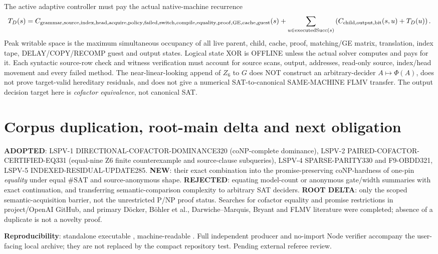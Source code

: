 \documentclass[11pt]{article}
\begin{document}
\noindent The active adaptive controller must pay the actual native-machine recurrence
\[
T_D(s)=C_{\rm grammar,source,index,head,acquire,policy,failed,switch,
compile,equality,proof,GE,cache,guest}(s)
+\sum_{u\in{\rm executedSucc}(s)}
\left(C_{\rm child,output,bit}(s,u)+T_D(u)\right).
\]
Peak writable space is the maximum simultaneous occupancy of all live parent, child, cache, proof, matching/GE matrix, translation, index tape, DELAY/COPY/RECOMP guest and output states. Logical state XOR is OFFLINE unless the actual solver computes and pays for it. Each syntactic source-row check and witness verification must account for source scans, output, addresses, read-only source, index/head movement and every failed method. The near-linear-looking append of $Z_6$ to $G$ does NOT construct an arbitrary-decider $A\mapsto\Phi(A)$, does not prove target-valid hereditary residuals, and does not give a numerical SAT-to-canonical SAME-MACHINE FLMV transfer. The output decision target here is \emph{cofactor equivalence}, not canonical SAT.

\section{Corpus duplication, root-main delta and next obligation}
\noindent\textbf{ADOPTED}: LSPV-1 DIRECTIONAL-COFACTOR-DOMINANCE320 (coNP-complete dominance), LSPV-2 PAIRED-COFACTOR-CERTIFIED-EQ331 (equal-nine Z6 finite counterexample and source-clause subqueries), LSPV-4 SPARSE-PARITY330 and F9-OBDD321, LSPV-5 INDEXED-RESIDUAL-UPDATE285. \textbf{NEW}: their exact combination into the promise-preserving coNP-hardness of one-pin \emph{equality} under equal $\#\mathrm{SAT}$ and source-anonymous shape. \textbf{REJECTED}: equating model-count or anonymous gate/width summaries with exact continuation, and transferring semantic-comparison complexity to arbitrary SAT deciders. \textbf{ROOT DELTA}: only the scoped semantic-acquisition barrier, not the unrestricted P/NP proof status. Searches for cofactor equality and promise restrictions in project/OpenAI GitHub, and primary D\"ocker, B\"ohler et al., Darwiche--Marquis, Bryant and FLMV literature were completed; absence of a duplicate is not a novelty proof.

\noindent\textbf{Reproducibility}: standalone executable
,
machine-readable
.
Full independent producer and no-import Node verifier accompany the user-facing local archive; they are not replaced by the compact repository test. Pending external referee review.
\end{document}
